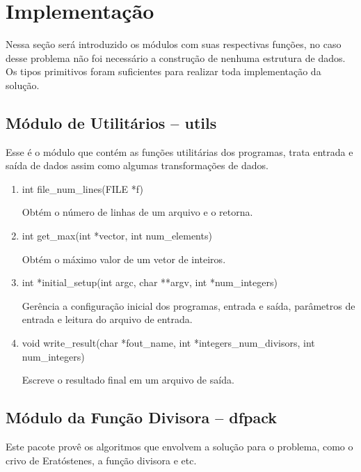 \documentclass[12pt]{article}
\begin{document}
\section{Implementação}
\label{sec:implementacao}

Nessa seção será introduzido os módulos com suas respectivas funções, no caso desse problema não foi necessário a construção de nenhuma estrutura de dados. Os tipos primitivos foram suficientes para realizar toda implementação da solução.
\subsection{Módulo de Utilitários -- utils}

Esse é o módulo que contém as funções utilitárias dos programas, trata entrada e saída de dados assim como algumas transformações de dados.

\begin{enumerate}

	\item int file\_num\_lines(FILE *f)

	      Obtém o número de linhas de um arquivo e o retorna.

	\item int get\_max(int *vector, int num\_elements)

	      Obtém o máximo valor de um vetor de inteiros.

	\item int *initial\_setup(int argc, char **argv, int *num\_integers)

	      Gerência a configuração inicial dos programas, entrada e saída, parâmetros de entrada e leitura do arquivo de entrada.

	\item void write\_result(char *fout\_name, int *integers\_num\_divisors, int num\_integers)

	      Escreve o resultado final em um arquivo de saída.

\end{enumerate}

\subsection{ Módulo da Função Divisora -- dfpack}

Este pacote provê os algoritmos que envolvem a solução para o problema, como o crivo de Eratóstenes, a função divisora e etc.
\end{document}
